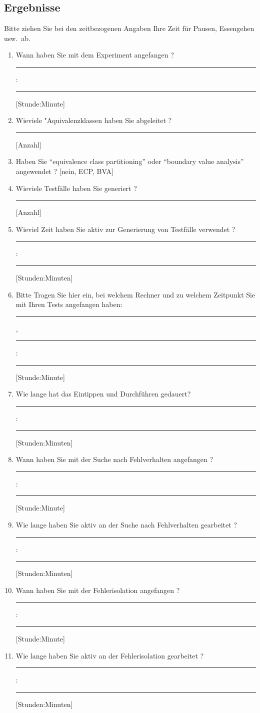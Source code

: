 \subsection*{Ergebnisse}

Bitte ziehen Sie bei den zeitbezogenen Angaben Ihre Zeit f\"ur Pausen,
Essengehen usw.~ab. 

\begin{enumerate}
\addtocounter{enumi}{3}

\item Wann haben Sie mit dem Experiment angefangen ? 
\rule{7mm}{.5pt} : \rule{7mm}{.5pt} [Stunde:Minute]

\item Wieviele "Aquivalenzklassen haben Sie abgeleitet ?
\rule{7mm}{.5pt} [Anzahl]  

\item Haben Sie "`equivalence class partitioning"' oder
"`boundary value analysis"' angewendet ? [{nein, ECP, BVA}]

\item Wieviele Testf\"alle haben Sie generiert ? \rule{7mm}{.5pt} [Anzahl]  

\item Wieviel Zeit haben Sie aktiv zur Generierung von Testf\"alle
verwendet ? \\ 
\rule{7mm}{.5pt} : \rule{7mm}{.5pt} [Stunden:Minuten]

\item Bitte Tragen Sie hier ein, bei welchem Rechner und zu welchem
Zeitpunkt Sie mit Ihren Tests angefangen haben:
\rule{4cm}{.5pt}, \rule{7mm}{.5pt} : \rule{7mm}{.5pt} [Stunde:Minute] 

\item Wie lange hat das Eintippen und Durchf\"uhren gedauert?
\rule{7mm}{.5pt} : \rule{7mm}{.5pt} [Stunden:Minuten]

\item Wann haben Sie mit der Suche nach Fehlverhalten angefangen ? 
\rule{7mm}{.5pt} : \rule{7mm}{.5pt} [Stunde:Minute]

\item Wie lange haben Sie aktiv an der Suche nach Fehlverhalten gearbeitet ? \\
\rule{7mm}{.5pt} : \rule{7mm}{.5pt} [Stunden:Minuten]

\item Wann haben Sie mit der Fehlerisolation angefangen ?
\rule{7mm}{.5pt} : \rule{7mm}{.5pt} [Stunde:Minute]

\item Wie lange haben Sie aktiv an der Fehlerisolation gearbeitet ? 
\rule{7mm}{.5pt} : \rule{7mm}{.5pt} [Stunden:Minuten]


\end{enumerate}
